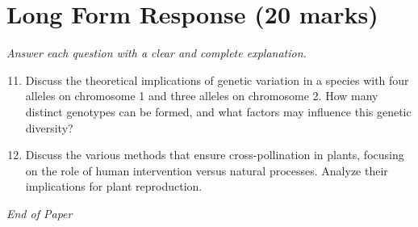 \documentclass[12pt]{article}
\begin{document}
\section*{Long Form Response (20 marks)}
\textit{Answer each question with a clear and complete explanation.}
\begin{enumerate}[label=\arabic*.]
\setcounter{enumi}{10}
\item Discuss the theoretical implications of genetic variation in a species with four alleles on chromosome 1 and three alleles on chromosome 2. How many distinct genotypes can be formed, and what factors may influence this genetic diversity?
\item Discuss the various methods that ensure cross-pollination in plants, focusing on the role of human intervention versus natural processes. Analyze their implications for plant reproduction.
\end{enumerate}

\vfill
\noindent\textit{End of Paper}
\end{document}
